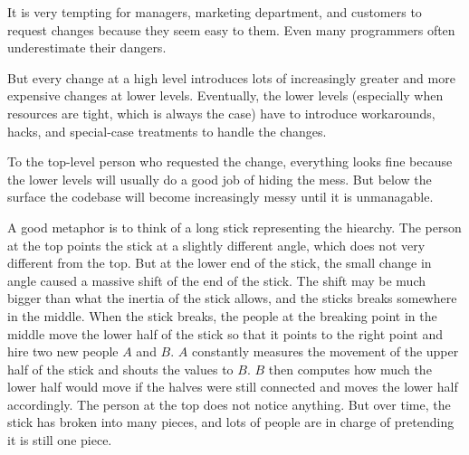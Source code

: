 It is very tempting for managers, marketing department, and customers to request changes because they seem easy to them.
Even many programmers often underestimate their dangers.

But every change at a high level introduces lots of increasingly greater and more expensive changes at lower levels.
Eventually, the lower levels (especially when resources are tight, which is always the case) have to introduce workarounds, hacks, and special-case treatments to handle the changes.

To the top-level person who requested the change, everything looks fine because the lower levels will usually do a good job of hiding the mess.
But below the surface the codebase will become increasingly messy until it is unmanagable.

A good metaphor is to think of a long stick representing the hiearchy.
The person at the top points the stick at a slightly different angle, which does not very different from the top.
But at the lower end of the stick, the small change in angle caused a massive shift of the end of the stick.
The shift may be much bigger than what the inertia of the stick allows, and the sticks breaks somewhere in the middle.
When the stick breaks, the people at the breaking point in the middle move the lower half of the stick so that it points to the right point and hire two new people $A$ and $B$.
$A$ constantly measures the movement of the upper half of the stick and shouts the values to $B$.
$B$ then computes how much the lower half would move if the halves were still connected and moves the lower half accordingly.
The person at the top does not notice anything.
But over time, the stick has broken into many pieces, and lots of people are in charge of pretending it is still one piece.

